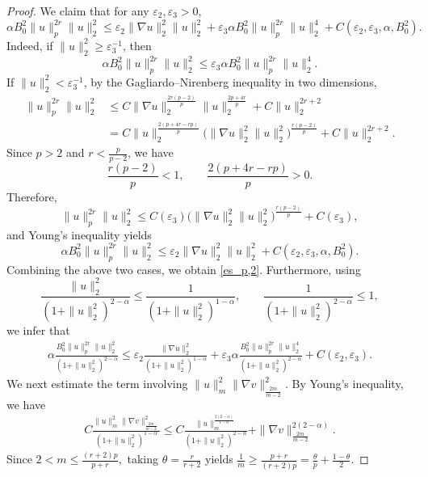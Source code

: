 \documentclass[reqno, 11pt]{amsart}
\theoremstyle{definition}
\numberwithin{equation}{section} \numberwithin{lem}{section}
\numberwithin{thm}{section} \numberwithin{prop}{section}
\numberwithin{cor}{section} \numberwithin{rem}{section}
\numberwithin{defn}{section}
\begin{document}
\begin{proof}
    We claim that for any $\varepsilon_2,\varepsilon_3>0$,
	\begin{equation}
		\label{es_p,2}
		\alpha{B_0^2}\|u\|_p^{2r}\|u\|_2^2
		\le
		\varepsilon_2\|\nabla u\|_2^2\|u\|_2^2
		+\varepsilon_3 \alpha{B_0^2}\|u\|_p^{2r}\|u\|_2^4
		+C(\varepsilon_2,\varepsilon_3,\alpha,{B_0^2}).
	\end{equation}
	Indeed,   if $\|u\|_2^2\ge \varepsilon_3^{-1}$, then
	\[
	\alpha{B_0^2}\|u\|_p^{2r}\|u\|_2^2
	\le
	\varepsilon_3 \alpha{B_0^2}\|u\|_p^{2r}\|u\|_2^4.
	\]
    If $\|u\|_2^2<\varepsilon_3^{-1}$, by the Gagliardo--Nirenberg inequality in two dimensions,
	\begin{align*}
		\|u\|_p^{2r}\|u\|_2^2
		&\le
		C\|\nabla u\|_2^{\frac{2r(p-2)}{p}}\|u\|_2^{\frac{2p+4r}{p}}
		+C\|u\|_2^{2r+2}\\
		&=
		C\|u\|_2^{\frac{2(p+4r-rp)}{p}}
		\big(\|\nabla u\|_2^2\|u\|_2^2\big)^{\frac{r(p-2)}{p}}
		+C\|u\|_2^{2r+2}.
	\end{align*}
	Since $p>2$ and $r<\frac{p}{p-2}$, we have
	\[
	\frac{r(p-2)}{p}<1,
	\qquad
	\frac{2(p+4r-rp)}{p}>0.
	\]
	 Therefore,
	\[
	\|u\|_p^{2r}\|u\|_2^2
	\le
	C(\varepsilon_3)\big(\|\nabla u\|_2^2\|u\|_2^2\big)^{\frac{r(p-2)}{p}}
	+C(\varepsilon_3),
	\]
	and Young's inequality yields
	\[
	\alpha{B_0^2}\|u\|_p^{2r}\|u\|_2^2
	\le
	\varepsilon_2\|\nabla u\|_2^2\|u\|_2^2
	+C(\varepsilon_2,\varepsilon_3,\alpha,{B_0^2}).
	\]
	Combining the above two cases, we obtain \eqref{es_p,2}.
	Furthermore, using
	\[
	\frac{\|u\|_2^2}{(1+\|u\|_2^2)^{2-\alpha}}
	\le
	\frac{1}{(1+\|u\|_2^2)^{1-\alpha}},
	\qquad
	\frac{1}{(1+\|u\|_2^2)^{2-\alpha}}\le 1,
	\]
	we infer that
	\begin{align}
		\label{es_a,q,2}
		\alpha\frac{{B_0^2}\|u\|_p^{2r}\|u\|_2^2}{(1+\|u\|_2^2)^{2-\alpha}}
		\le
		\varepsilon_2\frac{\|\nabla u\|_2^2}{(1+\|u\|_2^2)^{1-\alpha}}
		+\varepsilon_3 \alpha\frac{{B_0^2}\|u\|_p^{2r}\|u\|_2^4}{(1+\|u\|_2^2)^{2-\alpha}}
+C(\varepsilon_2,\varepsilon_3).
	\end{align}
	We next estimate the term involving $\|u\|_m^2\|\nabla v\|_{\frac{2m}{m-2}}^2$.
	By Young's inequality, we have
	\begin{align}
		\label{u-v-term}
		C\frac{\|u\|_m^2\|\nabla v\|_{\frac{2m}{m-2}}^2}{(1+\|u\|_2^2)^{1-\alpha}}
		\le
		C\frac{\|u\|_m^{\frac{2(2-\alpha)}{1-\alpha}}}{(1+\|u\|_2^2)^{2-\alpha}}
		+\|\nabla v\|_{\frac{2m}{m-2}}^{2(2-\alpha)}.
	\end{align}
	Since $2<m\le \frac{(r+2)p}{p+r},$
	taking $\theta=\frac{r}{r+2}$ yields $\frac1m\ge \frac{p+r}{(r+2)p}= \frac{\theta}{p}+\frac{1-\theta}{2}.$

\end{proof}
\end{document}

